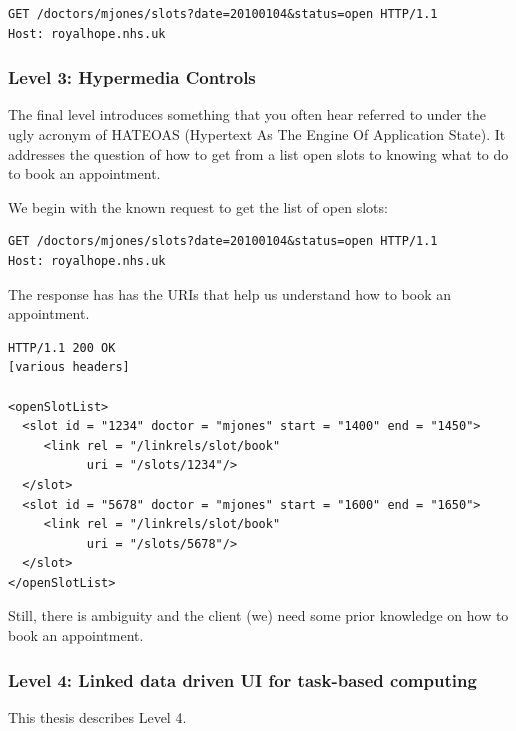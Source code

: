 \lstset{language=}
\begin{lstlisting}[caption=Level 2: Safely fetching the list of open slots using \lstinline{GET}.]
GET /doctors/mjones/slots?date=20100104&status=open HTTP/1.1
Host: royalhope.nhs.uk
\end{lstlisting}

\subsubsection{Level 3: Hypermedia Controls}

The final level introduces something that you often hear referred to under the ugly acronym of HATEOAS (Hypertext As The Engine Of Application State). It addresses the question of how to get from a list open slots to knowing what to do to book an appointment. \citep{richardsonmaturitymodel}

We begin with the known request to get the list of open slots:

\lstset{language=}
\begin{lstlisting}[caption=Fetching the list of open slots.]
GET /doctors/mjones/slots?date=20100104&status=open HTTP/1.1
Host: royalhope.nhs.uk
\end{lstlisting}

The response has has the URIs that help us understand how to book an appointment.

\lstset{language=}
\begin{lstlisting}[caption=Level 3: The response contains information that helps us to book an appointment.]
HTTP/1.1 200 OK
[various headers]

<openSlotList>
  <slot id = "1234" doctor = "mjones" start = "1400" end = "1450">
     <link rel = "/linkrels/slot/book"
           uri = "/slots/1234"/>
  </slot>
  <slot id = "5678" doctor = "mjones" start = "1600" end = "1650">
     <link rel = "/linkrels/slot/book"
           uri = "/slots/5678"/>
  </slot>
</openSlotList>
\end{lstlisting}

Still, there is ambiguity and the client (we) need some prior knowledge on how to book an appointment.

\subsubsection{Level 4: Linked data driven UI for task-based computing}

This thesis describes Level 4.

